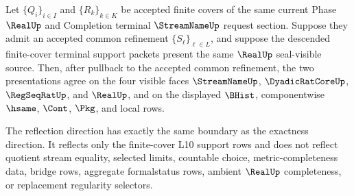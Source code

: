 \begin{theorem}
\label{thm:streamname-finite-cover-support-preservation-reflection}
Let $\{Q_i\}_{i \in I}$ and $\{R_k\}_{k \in K}$ be accepted finite covers of
the same current Phase $\RealUp$ and Completion terminal $\StreamNameUp$
request section. Suppose they admit an accepted common refinement
$\{S_\ell\}_{\ell \in L}$, and suppose the descended finite-cover terminal
support packets present the same $\RealUp$ seal-visible source. Then, after
pullback to the accepted common refinement, the two presentations agree on
the four visible faces $\StreamNameUp$, $\DyadicRatCoreUp$, $\RegSeqRatUp$,
and $\RealUp$, and on the displayed $\BHist$, componentwise $\hsame$,
$\Cont$, $\Pkg$, and local \NameCert{} rows.

The reflection direction has exactly the same boundary as the exactness
direction. It reflects only the finite-cover L10 support rows and does not
reflect quotient stream equality, selected limits, countable choice,
metric-completeness data, bridge rows, aggregate formalstatus rows, ambient
$\RealUp$ completeness, or replacement regularity selectors.
\end{theorem}
